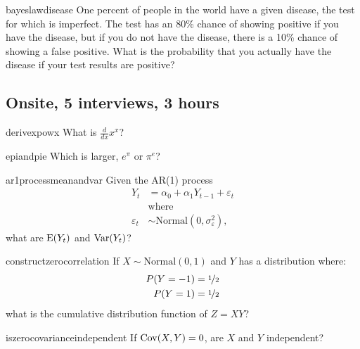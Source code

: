 \documentclass[a4paper]{article}
\begin{document}
\begin{question}{bayeslawdisease}
One percent of people in the world have a given disease,
the test for which is imperfect.
The test has an 80\% chance of showing positive if you have the disease, but if you do not have the disease,
there is a 10\% chance of showing a false positive.
What is the probability that you actually have the disease if your test results are positive?
\end{question}

\clearpage




\clearpage
\subsection{Onsite, 5 interviews, 3 hours}
\begin{question}{derivexpowx}
What is $\frac{d}{dx}x^x$?
\end{question}


\begin{question}{epiandpie}
Which is larger,
$e^\pi$
or
$\pi^e$?
\end{question}



\begin{question}{ar1processmeanandvar}
Given the AR(1) process
\begin{align*}
  Y_t &= \alpha_0 + \alpha_1 Y_{t-1} + \varepsilon_{t} \\
   & \text{where} \\
   \varepsilon_{t} &\sim \text{Normal}(0,\sigma_{\varepsilon}^2)
   \text{,}
\end{align*}
what are
$\operatorname{\mathrm{E}}(Y_t)$
and
$\operatorname{\mathrm{Var}}(Y_t)$?
\end{question}


\begin{question}{constructzerocorrelation}
If $X \sim \text{Normal}(0, 1)$ and $Y$ has a distribution where:
\begin{align*}
 P(Y=-1) &=  \nicefrac{1}{2} \\
 P(Y=1)  &=  \nicefrac{1}{2}
\end{align*}
what is the cumulative distribution function of $Z=XY$?
\end{question}


\begin{question}{iszerocovarianceindependent}
If $\operatorname{\mathrm{Cov}}(X,Y)=0$, are $X$ and $Y$ independent?
\end{question}
\end{document}
